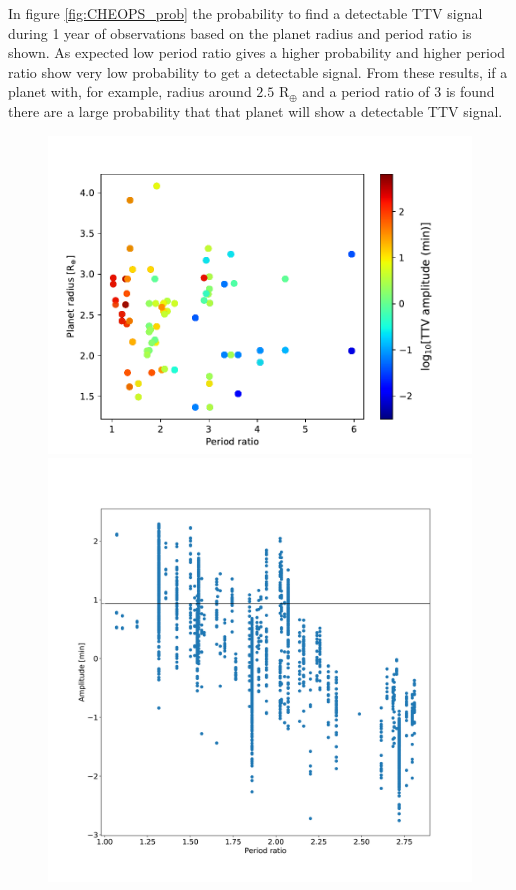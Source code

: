 \documentclass[12pt]{report}
\begin{document}
	In figure \ref{fig:CHEOPS_prob} the probability to find a detectable TTV signal during 1 year of observations based on the planet radius and period ratio is shown. As expected low period ratio gives a higher probability and higher period ratio show very low probability to get a detectable signal. From these results, if a planet with, for example, radius around $2.5$ R$_{\oplus}$ and a period ratio of 3 is found there are a large probability that that planet will show a detectable TTV signal.
\begin{figure}
\centering
\begin{minipage}{.5\textwidth}
  \centering
  \includegraphics[width=1\linewidth]{img/perFracRad.pdf}
 

\end{minipage}%
\begin{minipage}{.5\textwidth}
  \centering
  \includegraphics[width=1\linewidth]{img/ampPratDouble_3_line.pdf}
  


\end{minipage}
\end{figure}
\end{document}
